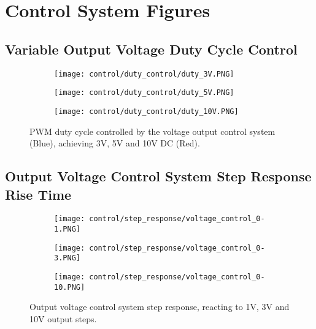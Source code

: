 \chapter{Control System Figures}\label{A:control}
\vspace{-20pt}

\section{Variable Output Voltage Duty Cycle Control} \label{A:control_duty}

\begin{figure}[H]
    
    \centering
    \begin{subfigure}{0.5\textwidth}
        \texttt{[image: control/duty\_control/duty\_3V.PNG]}
    \end{subfigure}
    \begin{subfigure}{0.5\textwidth}
        \texttt{[image: control/duty\_control/duty\_5V.PNG]}
    \end{subfigure}
    \begin{subfigure}{0.5\textwidth}
        \texttt{[image: control/duty\_control/duty\_10V.PNG]}
    \end{subfigure}
    \caption{PWM duty cycle controlled by the voltage output control system (Blue), achieving 3V, 5V and 10V DC (Red).}
\end{figure}

\section{Output Voltage Control System Step Response Rise Time} \label{A:control_step_rise}
\begin{figure}[H]
    \centering
    \begin{subfigure}{0.62\textwidth}
        \texttt{[image: control/step\_response/voltage\_control\_0-1.PNG]}
    \end{subfigure}
    \begin{subfigure}{0.62\textwidth}
        \texttt{[image: control/step\_response/voltage\_control\_0-3.PNG]}
    \end{subfigure}
    \begin{subfigure}{0.62\textwidth}
        \texttt{[image: control/step\_response/voltage\_control\_0-10.PNG]}
    \end{subfigure}
    \caption{Output voltage control system step response, reacting to 1V, 3V and 10V output steps.}
\end{figure}

